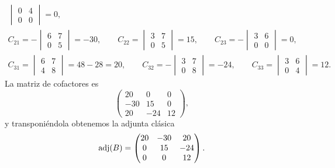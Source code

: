 \documentclass[12pt,a4paper]{article}
\begin{document}
\begin{solucion}
\begin{gather*}
            \begin{vmatrix}
                0 & 4\\
                0 & 0
            \end{vmatrix}
            =0,
            \\
            C_{21}=
            -\begin{vmatrix}
                6 & 7\\
                0 & 5
            \end{vmatrix}
            =-30,\qquad C_{22}=
            \begin{vmatrix}
                3 & 7\\
                0 & 5
            \end{vmatrix}
            =15,\qquad C_{23}=
            -\begin{vmatrix}
                3 & 6\\
                0 & 0
            \end{vmatrix}
            =0,
            \\
            C_{31}=
            \begin{vmatrix}
                6 & 7\\
                4 & 8
            \end{vmatrix}
            =48-28=20,\qquad C_{32}=
            -\begin{vmatrix}
                3 & 7\\
                0 & 8
            \end{vmatrix}
            =-24,\qquad C_{33}=
            \begin{vmatrix}
                3 & 6\\
                0 & 4
            \end{vmatrix}
            =12.
        \end{gather*}
        La matriz de cofactores es
        \begin{equation*}
            \begin{pmatrix}
                20 & 0 & 0\\
                -30 & 15 & 0\\
                20 & -24 & 12
            \end{pmatrix},
        \end{equation*}
        y transponiéndola obtenemos la adjunta clásica
        \begin{equation*}
            \operatorname{adj}(B)=
            \begin{pmatrix}
                20 & -30 & 20\\
                0 & 15 & -24\\
                0 & 0 & 12
            \end{pmatrix}.
        \end{equation*}
    \end{solucion}
\end{document}
